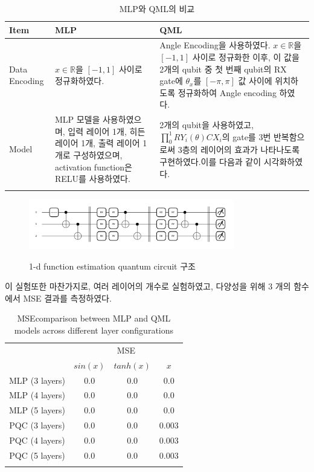 \begin{itemize}
\begin{table}[ht]
    \centering
    \begin{tabular}{ l||p{5.5cm}||p{5.5cm}}
    \Xhline{3\arrayrulewidth}
    \textbf{Item} & \textbf{MLP} & \textbf{QML} \\
    \hline
    Data Encoding & $x \in \mathbb{R}$을 $[-1, 1]$ 사이로 정규화하였다. &
    Angle Encoding을 사용하였다. $x \in \mathbb{R}$을 $[-1, 1]$ 사이로 정규화한 이후, 이 값을 2개의 qubit 중 첫 번째 qubit의 RX gate에 $\theta_x$를 $[-\pi, \pi]$ 값 사이에 위치하도록 정규화하여 Angle encoding 하였다. \\
    \hline
    Model & MLP 모델을 사용하였으며, 입력 레이어 1개, 히든 레이어 1개, 출력 레이어 1개로 구성하였으며, activation function은 RELU를 사용하였다. &
    2개의 qubit을 사용하였고, $\prod_{0}^{1} RY_i(\theta)CX_i$의 gate를 3번 반복함으로써 3층의 레이어의 효과가 나타나도록 구현하였다.이를 다음과 같이 시각화하였다.{fig:1d-image} \\
    \Xhline{3\arrayrulewidth}
    \end{tabular}
    \caption{MLP와 QML의 비교}
    \label{tab:mlp_qml_comparison_1d}
\end{table}

\begin{figure}[h]
    \centering
    \includegraphics[width=0.8\textwidth]{figs/pqc_1d}\
\caption{1-d function estimation quantum circuit 구조}
\label{fig:1d-image}
\end{figure}
\end{itemize}
\clearpage

이 실험또한 마찬가지로, 여러 레이어의 개수로 실험하였고, 다양성을 위해 3 개의 함수에서 MSE  결과를 측정하였다.

\begin{table}[ht]
    \centering
    \begin{tabular}{c|ccc}
    \Xhline{3\arrayrulewidth}
    \multirow{2}{*}{Layers} & \multicolumn{3}{c}{MSE} \\
    \cline{2-4}
    & $sin(x)$  & $tanh(x)$ & $x$ \\
    \hline
    MLP (3 layers) & 0.0 & 0.0 & 0.0 \\
    MLP (4 layers) & 0.0 & 0.0 & 0.0 \\
    MLP (5 layers) & 0.0 & 0.0 & 0.0 \\
    \hline
    PQC (3 layers) & 0.0 & 0.0 & 0.003 \\
    PQC (4 layers) & 0.0 & 0.0 & 0.003 \\
    PQC (5 layers) & 0.0 & 0.0 & 0.003 \\
    \Xhline{3\arrayrulewidth}
    \end{tabular}
    \caption{MSEcomparison between MLP and QML models across different layer configurations}
    \label{tab:mse_comparison}
\end{table}




